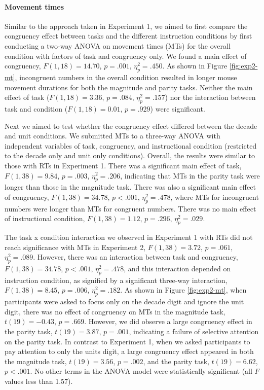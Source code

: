 \documentclass[english,man]{apa6}
\theoremstyle{definition}
\theoremstyle{definition}
\theoremstyle{definition}
\theoremstyle{remark}
\begin{document}
\paragraph{Movement times}\label{movement-times}

Similar to the approach taken in Experiment 1, we aimed to first compare
the congruency effect between tasks and the different instruction
conditions by first conducting a two-way ANOVA on movement times (MTs)
for the overall condition with factors of task and congruency only. We
found a main effect of congruency, \(F(1, 18) = 14.70\), \(p = .001\),
\(\eta^2_p = .450\). As shown in Figure \ref{fig:exp2-mt}, incongruent
numbers in the overall condition resulted in longer mouse movement
durations for both the magnitude and parity tasks. Neither the main
effect of task (\(F(1, 18) = 3.36\), \(p = .084\), \(\eta^2_p = .157\))
nor the interaction between task and condition (\(F(1, 18) = 0.01\),
\(p = .929\)) were significant.

Next we aimed to test whether the congruency effect differed between the
decade and unit conditions. We submitted MTs to a three-way ANOVA with
independent variables of task, congruency, and instructional condition
(restricted to the decade only and unit only conditions). Overall, the
results were similar to those with RTs in Experiment 1. There was a
significant main effect of task, \(F(1, 38) = 9.84\), \(p = .003\),
\(\eta^2_p = .206\), indicating that MTs in the parity task were longer
than those in the magnitude task. There was also a significant main
effect of congruency, \(F(1, 38) = 34.78\), \(p < .001\),
\(\eta^2_p = .478\), where MTs for incongruent numbers were longer than
MTs for congruent numbers. There was no main effect of instructional
condition, \(F(1, 38) = 1.12\), \(p = .296\), \(\eta^2_p = .029\).

The task x condition interaction we observed in Experiment 1 with RTs
did not reach significance with MTs in Experiment 2,
\(F(1, 38) = 3.72\), \(p = .061\), \(\eta^2_p = .089\). However, there
was an interaction between task and congruency, \(F(1, 38) = 34.78\),
\(p < .001\), \(\eta^2_p = .478\), and this interaction depended on
instruction condition, as signified by a significant three-way
interaction, \(F(1, 38) = 8.45\), \(p = .006\), \(\eta^2_p = .182\). As
shown in Figure \ref{fig:exp2-mt}, when participants were asked to focus
only on the decade digit and ignore the unit digit, there was no effect
of congruency on MTs in the magnitude task, \(t(19) = -0.43\),
\(p = .669\). However, we did observe a large congruency effect in the
parity task, \(t(19) = 3.87\), \(p = .001\), indicating a failure of
selective attention on the parity task. In contrast to Experiment 1,
when we asked participants to pay attention to only the units digit, a
large congruency effect appeared in both the magnitude task,
\(t(19) = 3.56\), \(p = .002\), and the parity task, \(t(19) = 6.62\),
\(p < .001\). No other terms in the ANOVA model were statistically
significant (all \(F\) values less than 1.57).
\end{document}
